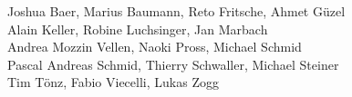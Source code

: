 %
%
%

Joshua Baer,                      %
Marius Baumann,                   %
Reto Fritsche,                    %
Ahmet Güzel%
\\
Alain Keller,                     %
Robine Luchsinger,                %
Jan Marbach%
\\
Andrea Mozzin Vellen,             %
Naoki Pross,                      %
Michael Schmid%
\\
Pascal Andreas Schmid,            %
Thierry Schwaller,                %
Michael Steiner%
\\
Tim Tönz,                         %
Fabio Viecelli,                   %
Lukas Zogg%
